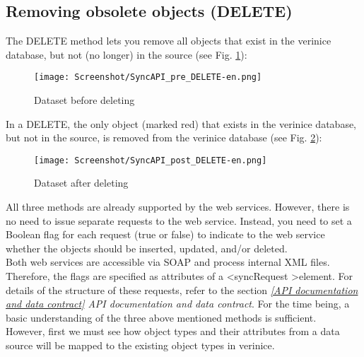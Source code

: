 \documentclass[a4paper,10pt]{book}
\begin{document}
\subsection{Removing obsolete objects (DELETE)}
The DELETE method lets you remove all objects that exist in the verinice database, but not (no longer) in the source (see Fig. \ref{Dataset before deleting}):
\newline
\begin{figure}[htb!]
  \centering
  \texttt{[image: Screenshot/SyncAPI\_pre\_DELETE-en.png]}
  \caption{\label{Dataset before deleting} Dataset before deleting}
\end{figure}
\newline
In a \textsc{DELETE}, the only object (marked red) that exists in the verinice database, but not in the source,
is removed from the verinice database (see Fig. \ref{Dataset after deleting}):
\newline
\begin{figure}[htb!]
  \centering
  \texttt{[image: Screenshot/SyncAPI\_post\_DELETE-en.png]}
  \caption{\label{Dataset after deleting} Dataset after deleting}
\end{figure}
\newline
All three methods are already supported by the web services. However, there is no need to issue separate
requests to the web service. Instead, you need to set a Boolean flag for each request (true or false) to
indicate to the web service whether the objects should be inserted, updated, and/or deleted.
\newline\\
Both web services are accessible via SOAP and process internal XML files. Therefore, the flags are specified as attributes of a
\textless syncRequest \textgreater element. For details of the structure of these requests, refer to the section
{\em\ref{API documentation and data contract} API documentation and data contract}. For the time being, a basic
understanding of the three above mentioned methods is sufficient.
\newline\\
However, first we must see how object types and their attributes from a data source will be mapped to the existing
object types in verinice.
\end{document}
